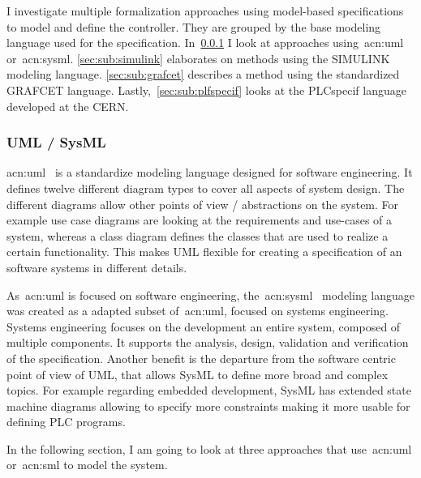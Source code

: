 I investigate multiple formalization approaches using model-based specifications to model and define the controller.
They are grouped by the base modeling language used for the specification.
In~\ref{sec:sub:uml} I look at approaches using~\acrshort{acn:uml} or~\acrlong{acn:sysml}.
\ref{sec:sub:simulink} elaborates on methods using the SIMULINK modeling language.
\ref{sec:sub:grafcet} describes a method using the standardized GRAFCET language.
Lastly,~\ref{sec:sub:plfspecif} looks at the PLCspecif language developed at the CERN.

\subsubsection{UML / SysML}
\label{sec:sub:uml}

\acrfull{acn:uml}~\cite{UML:2-5-1} is a standardize modeling language designed for software engineering.
It defines twelve different diagram types to cover all aspects of system design.
The different diagrams allow other points of view / abstractions on the system.
For example use case diagrams are looking at the requirements and use-cases of a system, whereas a class diagram defines the classes that are used to realize a certain functionality.
This makes UML flexible for creating a specification of an software systems in different details.

As~\acrshort{acn:uml} is focused on software engineering, the~\acrfull{acn:sysml}~\cite{SysML:1-6} modeling language was created as a adapted subset of~\acrshort{acn:uml}, focused on systems engineering.
Systems engineering focuses on the development an entire system, composed of multiple components.
It supports the analysis, design, validation and verification of the specification.
Another benefit is the departure from the software centric point of view of UML, that allows SysML to define more broad and complex topics.
For example regarding embedded development, SysML has extended state machine diagrams allowing to specify more constraints making it more usable for defining PLC programs.

In the following section, I am going to look at three approaches that use~\acrshort{acn:uml} or~\acrshort{acn:sml} to model the system.

